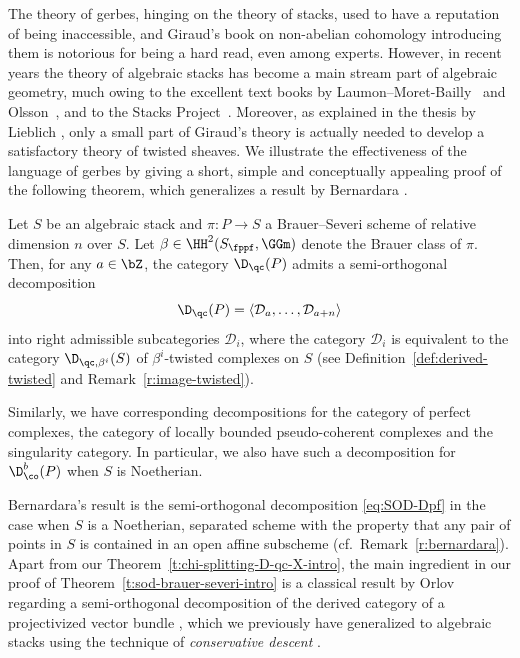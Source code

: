 The theory of gerbes,
hinging on the theory of stacks,
used to have a reputation of being inaccessible,
and Giraud's book on non-abelian cohomology \cite{giraud1971} introducing them is notorious for being a hard read,
even among experts.
However,
in recent years the theory of algebraic stacks has become a main stream part of algebraic geometry,
much owing to the excellent text books by Laumon--Moret-Bailly~\cite{lmb2000} and Olsson~\cite{olsson2016},
and to the Stacks Project~\cite{stacks-project}.
Moreover,
as explained in the thesis by Lieblich \cite{lieblich2004},
only a small part of Giraud's theory is actually needed to
develop a satisfactory theory of twisted sheaves.
We illustrate the effectiveness of the language of gerbes by giving a short,
simple and conceptually appealing proof of the following theorem,
which generalizes a result by Bernardara \cite[Theorem~4.1]{bernardara-BS-schemes}.

\begin{mtheorem}
  \label{t:sod-brauer-severi-intro}
  Let $S$ be an algebraic stack and $\pi\colon P \to S$ a
  Brauer--Severi 
  scheme of relative dimension $n$ over $S$.
  Let $\beta \in \HH^2(S_\fppf, \GGm)$ denote the Brauer class of
  $\pi$. 
  Then, for any $a \in \bZ$, the category $\D_\qc(P)$ admits a
  semi-orthogonal 
  decomposition
  \begin{equation}
    \label{eq:SOD-Dpf}
    \D_\qc(P) = \langle \mathcal{D}_a, \ldots, \mathcal{D}_{a+n}
    \rangle 
  \end{equation}
  into right admissible subcategories $\mathcal{D}_i$,
  where the category $\mathcal{D}_i$ is equivalent to 
  the category $\D_{\qc,\beta^i}(S)$
  of $\beta^i$-twisted complexes on $S$ (see
  Definition~\ref{def:derived-twisted} and Remark~\ref{r:image-twisted}). 
  
  Similarly, we have corresponding decompositions
  for the category of perfect complexes, the category of locally bounded pseudo-coherent complexes
  and the singularity category.  
  In particular, we also have such a decomposition for $\D^b_\co(P)$ when
  $S$ is Noetherian.
\end{mtheorem}

Bernardara's result is the semi-orthogonal decomposition 
\eqref{eq:SOD-Dpf} in the case when $S$ is a Noetherian, separated
scheme with the property that any pair of points in $S$ is
contained in an open affine subscheme (cf.\ Remark~\ref{r:bernardara}).
Apart from our Theorem~\ref{t:chi-splitting-D-qc-X-intro},
the main ingredient in our proof
of Theorem~\ref{t:sod-brauer-severi-intro} is a classical
result by Orlov regarding a semi-orthogonal decomposition of the derived
category of a projectivized vector bundle \cite[Theorem~2.6]{orlov1992},
which we previously have generalized to algebraic stacks using the technique of \emph{conservative descent}
\cite[Theorem~6.7, Corollary~6.8]{BS-conservative}.

